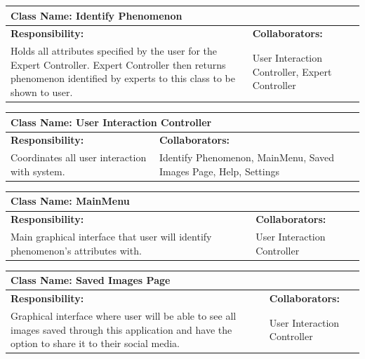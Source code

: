 \documentclass[]{article}
\begin{document}
	\begin{table}[ht]
		\centering
		\begin{tabular}{|p{5cm}|p{5cm}|}
		\hline 
		 \multicolumn{2}{|l|}{\textbf{Class Name: Identify Phenomenon}} \\
		\hline
		\textbf{Responsibility:} & \textbf{Collaborators:} \\
		\hline
		Holds all attributes specified by the user for the Expert Controller. Expert Controller then returns phenomenon identified by experts to this class to be shown to user. \vspace{1in} & User Interaction Controller, Expert Controller\\
		\hline
		\end{tabular}
	\end{table}

	\begin{table}[ht]
		\centering
		\begin{tabular}{|p{5cm}|p{5cm}|}
		\hline 
		 \multicolumn{2}{|l|}{\textbf{Class Name: User Interaction Controller}} \\
		\hline
		\textbf{Responsibility:} & \textbf{Collaborators:} \\
		\hline
		 Coordinates all user interaction with system. \vspace{1in} & Identify Phenomenon, MainMenu, Saved Images Page, Help, Settings \\
		\hline
		\end{tabular}
	\end{table}

	\begin{table}[ht]
		\centering
		\begin{tabular}{|p{5cm}|p{5cm}|}
		\hline 
		 \multicolumn{2}{|l|}{\textbf{Class Name: MainMenu}} \\
		\hline
		\textbf{Responsibility:} & \textbf{Collaborators:} \\
		\hline
		Main graphical interface that user will identify phenomenon's attributes with. \vspace{1in} & User Interaction Controller \\
		\hline
		\end{tabular}
	\end{table}

	\begin{table}[ht]
		\centering
		\begin{tabular}{|p{5cm}|p{5cm}|}
		\hline 
		 \multicolumn{2}{|l|}{\textbf{Class Name: Saved Images Page}} \\
		\hline
		\textbf{Responsibility:} & \textbf{Collaborators:} \\
		\hline
		Graphical interface where user will be able to see all images saved through this application and have the option to share it to their social media. \vspace{1in} & User Interaction Controller\\
		\hline
		\end{tabular}
	\end{table}
\end{document}
